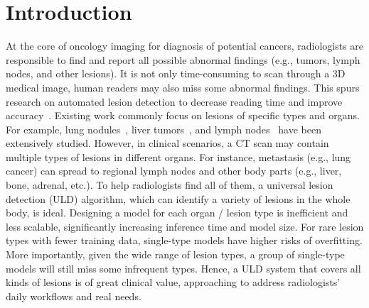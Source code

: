 \documentclass[runningheads]{llncs}
\def\eg{{e.g.}}
\begin{document}
\section{Introduction}
\label{sec:intro}

At the core of oncology imaging for diagnosis of potential cancers, radiologists are responsible to find and report all possible abnormal findings (e.g., tumors, lymph nodes, and other lesions). It is not only time-consuming to scan through a 3D medical image, human readers may also miss some abnormal findings. This spurs research on automated lesion detection to decrease reading time and improve accuracy~\cite{Litjens2017survey,Sahiner2018survey}. Existing work commonly focus on lesions of specific types and organs. For example, lung nodules~\cite{Liao2017noisyor,Zhu2018DeepEM,dou2017multilevel,Ding2017nodule}, liver tumors~\cite{Wang2019LiTS,Li2018HDenseUNet,Cohen2016liver}, and lymph nodes~\cite{Bouget2019lymph,Roth2016randView,Liu2016lymph,Shin2016TMICNN} have been extensively studied. However, in clinical scenarios, a CT scan may contain multiple types of lesions in different organs. For instance, metastasis (\eg, lung cancer) can spread to regional lymph nodes and other body parts (\eg, liver, bone, adrenal, etc.). To help radiologists find all of them, a universal lesion detection (ULD) algorithm, which can identify a variety of lesions in the whole body, is ideal. Designing a model for each organ / lesion type is inefficient and less scalable, significantly increasing inference time and model size. For rare lesion types with fewer training data, single-type models have higher risks of overfitting. More importantly, given the wide range of lesion types, a group of single-type models will still miss some infrequent types. Hence, a ULD system that covers all kinds of lesions is of great clinical value, approaching to address radiologists' daily workflows and real needs. 
\end{document}

